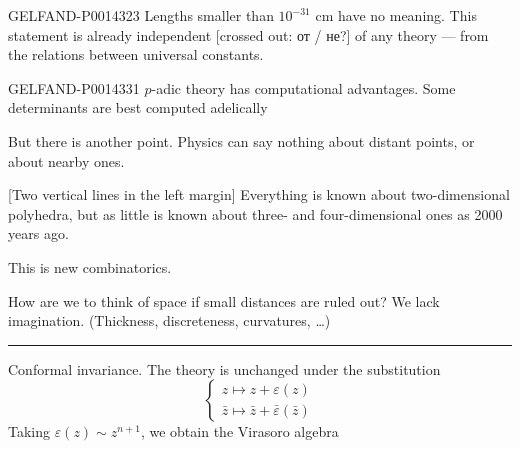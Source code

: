 \begin{GelfandAdjacentEvidence}{GELFAND-P001432}{3}
Lengths smaller than \(10^{-31}\) cm have no meaning. This statement is already independent [crossed out: от / не?]
of any theory — from the relations between universal constants.
\end{GelfandAdjacentEvidence}



\begin{GelfandAdjacentEvidence}{GELFAND-P001433}{1}
\(p\)-adic theory has computational advantages. Some determinants are best computed adelically

But there is another point. Physics can say nothing about distant points, or about nearby ones.

[Two vertical lines in the left margin]
Everything is known about two-dimensional polyhedra, but as little is known about three- and four-dimensional ones as 2000 years ago.

This is new combinatorics.
\end{GelfandAdjacentEvidence}



How are we to think of space if small distances are ruled out? We lack imagination. (Thickness, discreteness, curvatures, \ldots)

\begin{center}
\rule{1.5cm}{.35pt}
\end{center}

Conformal invariance. The theory is unchanged under the substitution
\begin{equation*}
\tag{22}
\begin{cases}
z\mapsto z+\varepsilon(z)\\
\bar z\mapsto\bar z+\bar\varepsilon(\bar z)
\end{cases}
\end{equation*}
Taking \(\varepsilon(z)\sim z^{n+1}\), we obtain the Virasoro algebra

